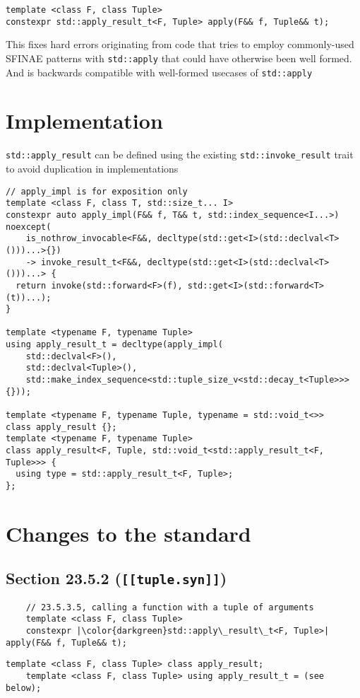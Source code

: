 \documentclass{article}
\begin{document}
\begin{lstlisting}
template <class F, class Tuple>
constexpr std::apply_result_t<F, Tuple> apply(F&& f, Tuple&& t);
\end{lstlisting}

This fixes hard errors originating from code that tries to employ commonly-used
SFINAE patterns with \texttt{std::apply} that could have otherwise been well
formed.  And is backwards compatible with well-formed usecases of
\texttt{std::apply}

\section{Implementation}
\texttt{std::apply\_result} can be defined using the existing
\texttt{std::invoke\_result} trait to avoid duplication in implementations

\begin{lstlisting}
// apply_impl is for exposition only
template <class F, class T, std::size_t... I>
constexpr auto apply_impl(F&& f, T&& t, std::index_sequence<I...>) noexcept(
    is_nothrow_invocable<F&&, decltype(std::get<I>(std::declval<T>()))...>{})
    -> invoke_result_t<F&&, decltype(std::get<I>(std::declval<T>()))...> {
  return invoke(std::forward<F>(f), std::get<I>(std::forward<T>(t))...);
}

template <typename F, typename Tuple>
using apply_result_t = decltype(apply_impl(
    std::declval<F>(),
    std::declval<Tuple>(),
    std::make_index_sequence<std::tuple_size_v<std::decay_t<Tuple>>>{}));

template <typename F, typename Tuple, typename = std::void_t<>>
class apply_result {};
template <typename F, typename Tuple>
class apply_result<F, Tuple, std::void_t<std::apply_result_t<F, Tuple>>> {
  using type = std::apply_result_t<F, Tuple>;
};
\end{lstlisting}

\section{Changes to the standard}
\subsection{Section 23.5.2 (\texttt{[[tuple.syn]]})}
\begin{lstlisting}
    // 23.5.3.5, calling a function with a tuple of arguments
    template <class F, class Tuple>
    constexpr |\color{darkgreen}std::apply\_result\_t<F, Tuple>| apply(F&& f, Tuple&& t);
\end{lstlisting}
\begin{lstlisting}[style=base]
    template <class F, class Tuple> class apply_result;
    template <class F, class Tuple> using apply_result_t = (see below);
\end{lstlisting}
\end{document}

